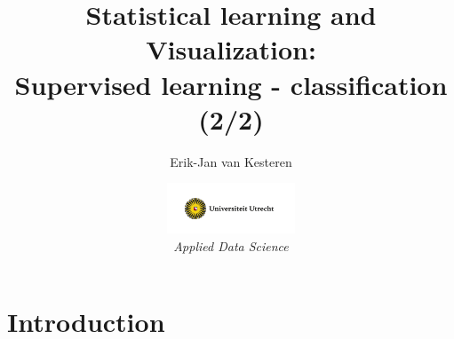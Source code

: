 \documentclass[xcolor=table,aspectratio=169]{beamer}
\title[Supervised learning-classification (2/2)]{
	{\LARGE{Statistical learning and Visualization}:\\\large{Supervised learning - classification (2/2)}}
}
\institute{
	\footnotesize Department of Methodology and Statistics\\
}
\author[van Kesteren]{Erik-Jan van Kesteren}
\date{\includegraphics[height=1.5cm]{pics/uu-logo.png}\\
	
	\footnotesize{\emph{Applied Data Science}}}
\begin{document}
\begin{frame}
	\maketitle
\end{frame}

\begin{frame}
	\tableofcontents
\end{frame}

\section{Introduction}\subsection{}
%	
%		
\end{document}
